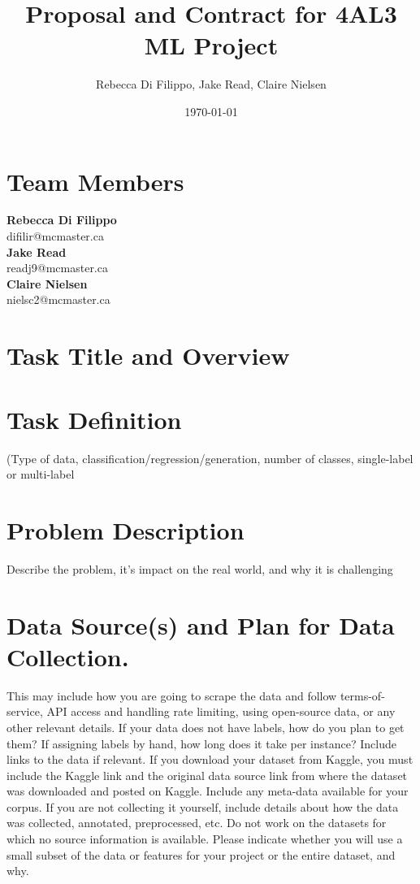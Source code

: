 \documentclass{article}
\title{Proposal and Contract for 4AL3 ML Project}
\author{Rebecca Di Filippo, Jake Read, Claire Nielsen}
\date{\today}
\begin{document}
\maketitle

\newpage
\section{Team Members}

\textbf{Rebecca Di Filippo}\\
difilir@mcmaster.ca\\

\textbf{Jake Read}\\
readj9@mcmaster.ca\\

\textbf{Claire Nielsen}\\
nielsc2@mcmaster.ca\\

\section{Task Title and Overview}

\section{Task Definition}
(Type of data, classification/regression/generation, number of classes, single-label or multi-label\\

\section{Problem Description}
Describe the problem, it’s impact on the real world, and why it is challenging \\

\section{Data Source(s) and Plan for Data Collection.}
This may include how you are going to scrape the data and follow terms-of-service, API access and handling rate limiting, using open-source data, or any other relevant details. If your data does not have labels, how do you plan to get them? If assigning labels by hand, how long does it take per instance? Include links to the data if relevant. If you download your dataset from Kaggle, you must include the Kaggle link and the original data source link from where the dataset was downloaded and posted on
Kaggle. Include any meta-data available for your corpus. If you are not collecting it yourself, include details about how the data was collected, annotated, preprocessed, etc. Do not work on the datasets for which no source information is available. Please indicate whether you will use a small subset of the data or features for your project or the entire dataset, and why. \\
\end{document}
